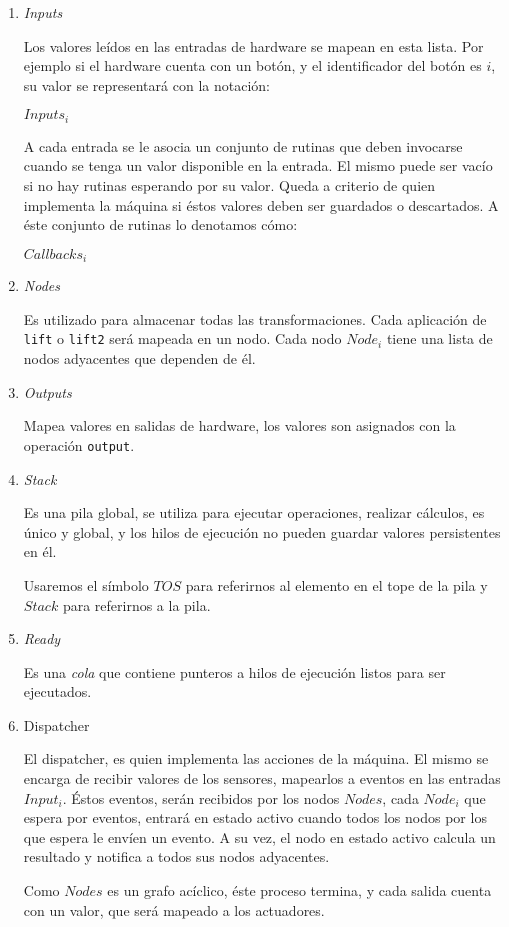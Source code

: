 \begin{enumerate}

\item \emph{Inputs}

  Los valores leídos en las entradas de hardware se mapean
en esta lista. Por ejemplo si el hardware cuenta con un botón,
y el identificador del botón es $i$,
su valor se representará con la notación:

  $Inputs_i$

  A cada entrada se le asocia un conjunto de
rutinas que deben invocarse cuando se tenga un
valor disponible en la entrada. El mismo puede ser vacío si
no hay rutinas esperando por su valor. Queda a criterio de quien
implementa la máquina si éstos valores deben ser guardados o
descartados.
  A éste conjunto de rutinas lo denotamos cómo:

  $Callbacks_i$

\item \emph{Nodes}

  Es utilizado para almacenar todas las transformaciones.
  Cada aplicación de \texttt{lift} o \texttt{lift2} será mapeada en un nodo.
  Cada nodo $Node_i$ tiene una lista de nodos adyacentes
que dependen de él.

\item \emph{Outputs}

  Mapea valores en salidas de hardware, los valores
  son asignados con la operación \texttt{output}.

\item \emph{Stack}

Es una pila global, se utiliza para ejecutar operaciones,
realizar cálculos, es único
y global, y los hilos de ejecución no pueden guardar valores
persistentes en él.

Usaremos el símbolo $TOS$ para referirnos al elemento en el tope
de la pila y $Stack$ para referirnos a la pila.

\item \emph{Ready}

Es una \emph{cola} que contiene punteros a hilos de ejecución
listos para ser ejecutados.


\item Dispatcher

El dispatcher, es quien implementa las acciones de la máquina.
El mismo se encarga de recibir valores de los sensores, mapearlos
a eventos en las entradas $Input_i$.
Éstos eventos, serán recibidos por los nodos $Nodes$, cada $Node_i$
que espera por eventos, entrará en estado activo cuando todos los nodos
por los que espera le envíen un evento.
A su vez, el nodo en estado activo calcula un resultado y notifica a
todos sus nodos adyacentes.

Como $Nodes$ es un grafo acíclico, éste proceso termina, y cada
salida cuenta con un valor, que será mapeado a los actuadores.

\end{enumerate}

